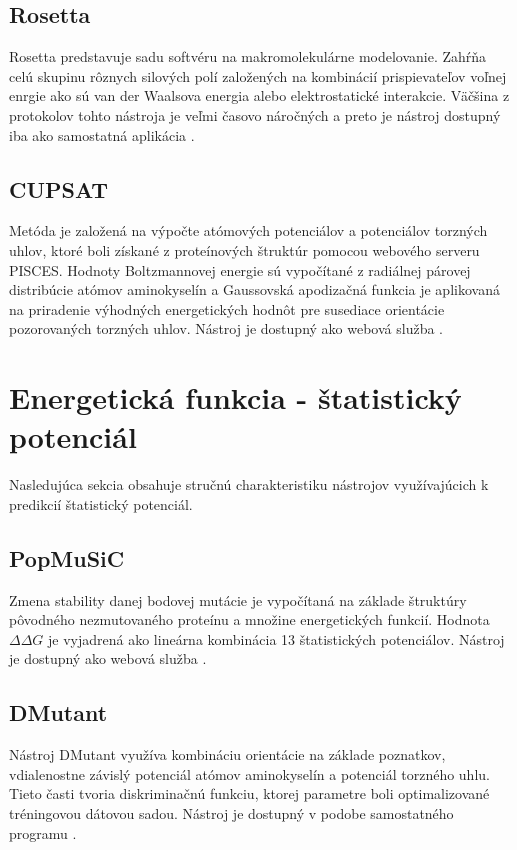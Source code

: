 \subsection{Rosetta}

Rosetta predstavuje sadu softvéru na makromolekulárne modelovanie. Zahŕňa celú skupinu rôznych silových polí založených na kombinácií prispievateľov voľnej enrgie ako sú van der Waalsova energia alebo elektrostatické interakcie. Väčšina z protokolov tohto nástroja je veľmi časovo náročných a preto je nástroj dostupný iba ako samostatná aplikácia \cite{rosetta}.

\subsection{CUPSAT}

Metóda je založená na výpočte atómových potenciálov a potenciálov torzných uhlov, ktoré boli získané z proteínových štruktúr pomocou webového serveru PISCES. Hodnoty Boltzmannovej energie sú vypočítané z radiálnej párovej distribúcie atómov aminokyselín a Gaussovská apodizačná funkcia je aplikovaná na priradenie výhodných energetických hodnôt pre susediace orientácie pozorovaných torzných uhlov. Nástroj je dostupný ako webová služba \cite{cupsat}.  

\section{Energetická funkcia - štatistický potenciál}

Nasledujúca sekcia obsahuje stručnú charakteristiku nástrojov využívajúcich k predikcií štatistický potenciál.

\subsection{PopMuSiC}

Zmena stability danej bodovej mutácie je vypočítaná na základe štruktúry pôvodného nezmutovaného proteínu a množine energetických funkcií. Hodnota $\Delta\Delta G$ je vyjadrená ako lineárna kombinácia 13 štatistických potenciálov. Nástroj je dostupný ako webová služba \cite{popmusic}.


\subsection{DMutant}

Nástroj DMutant využíva kombináciu orientácie na základe poznatkov, vdialenostne závislý potenciál atómov aminokyselín a potenciál torzného uhlu. Tieto časti tvoria diskriminačnú funkciu, ktorej parametre boli optimalizované tréningovou dátovou sadou. Nástroj je dostupný v podobe samostatného programu \cite{dmutant}.

